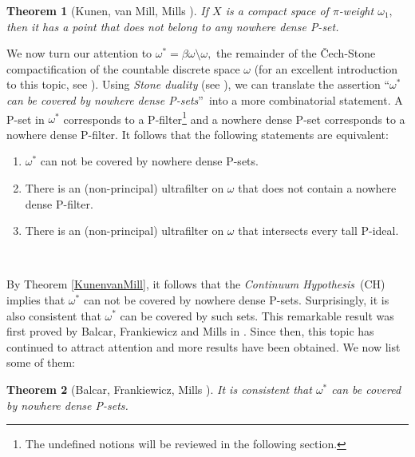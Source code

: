\documentclass{article}%
\newtheorem{theorem}{Theorem}
\begin{document}
\begin{theorem}
[Kunen, van Mill, Mills \cite{NowhereDenseClosedPsets}]If $X$ is a compact
space of $\pi$-weight $\omega_{1},$ then it has a point that does not belong
to any \textit{nowhere dense \emph{P-}set. \label{KunenvanMill}}
\end{theorem}

We now turn our attention to $\omega^{\ast}=\beta\omega\setminus\omega,$ the
remainder of the \v{C}ech-Stone compactification of the countable discrete
space $\omega$ (for an excellent introduction to this topic, see
\cite{betaomega}). Using \emph{Stone duality} (see \cite{LibroBooleanAlgebras}%
), we can translate the assertion \textquotedblleft$\omega^{\ast}$\textit{ can
be covered by nowhere dense \textsf{P}-sets}\textquotedblright\ into a more
combinatorial statement. A \textsf{P}-set in $\omega^{\ast}$ corresponds to a
\textsf{P}-filter\footnote{The undefined notions will be reviewed in the
following section.} and a nowhere dense \textsf{P}-set corresponds to a
nowhere dense \textsf{P}-filter. It follows that the following statements are equivalent:

\begin{enumerate}
\item $\omega^{\ast}$ can not be covered by nowhere dense \textsf{P}-sets.

\item There is an (non-principal) ultrafilter on $\omega$ that does not
contain a nowhere dense \textsf{P}-filter.

\item There is an (non-principal) ultrafilter on $\omega$ that intersects
every tall \textsf{P}-ideal.
\end{enumerate}

\qquad\ \ \qquad\ \ 

By Theorem \ref{KunenvanMill}, it follows that the \emph{Continuum
Hypothesis}\ (\textsf{CH) }implies that $\omega^{\ast}$ can not be covered by
nowhere dense \textsf{P}-sets. Surprisingly, it is also consistent that
$\omega^{\ast}$ can be covered by such sets. This remarkable result was first
proved by Balcar, Frankiewicz and Mills in \cite{MoreonNowhereDensePsets}.
Since then, this topic has continued to attract attention and more results
have been obtained. We now list some of them:

\begin{theorem}
[Balcar, Frankiewicz, Mills \cite{MoreonNowhereDensePsets}]It is consistent
that $\omega^{\ast}$ can be covered by nowhere dense \textsf{P}-sets.
\end{theorem}
\end{document}
